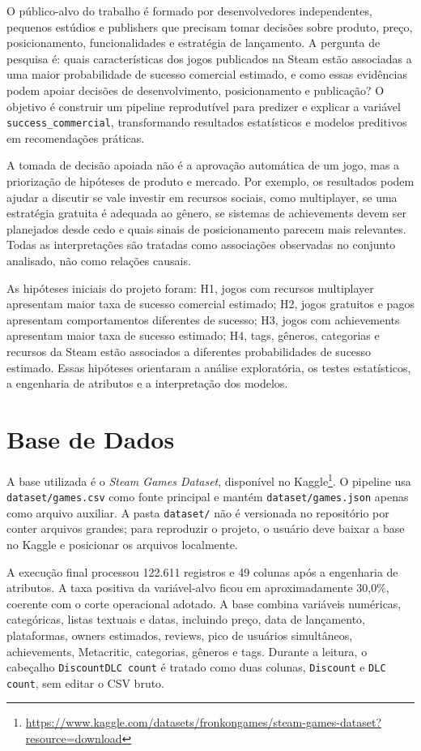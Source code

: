 \documentclass[12pt]{article}
\begin{document}
O público-alvo do trabalho é formado por desenvolvedores independentes, pequenos estúdios e publishers que precisam tomar decisões sobre produto, preço, posicionamento, funcionalidades e estratégia de lançamento. A pergunta de pesquisa é: quais características dos jogos publicados na Steam estão associadas a uma maior probabilidade de sucesso comercial estimado, e como essas evidências podem apoiar decisões de desenvolvimento, posicionamento e publicação? O objetivo é construir um pipeline reprodutível para predizer e explicar a variável \texttt{success\_commercial}, transformando resultados estatísticos e modelos preditivos em recomendações práticas.

A tomada de decisão apoiada não é a aprovação automática de um jogo, mas a priorização de hipóteses de produto e mercado. Por exemplo, os resultados podem ajudar a discutir se vale investir em recursos sociais, como multiplayer, se uma estratégia gratuita é adequada ao gênero, se sistemas de achievements devem ser planejados desde cedo e quais sinais de posicionamento parecem mais relevantes. Todas as interpretações são tratadas como associações observadas no conjunto analisado, não como relações causais.

As hipóteses iniciais do projeto foram: H1, jogos com recursos multiplayer apresentam maior taxa de sucesso comercial estimado; H2, jogos gratuitos e pagos apresentam comportamentos diferentes de sucesso; H3, jogos com achievements apresentam maior taxa de sucesso estimado; H4, tags, gêneros, categorias e recursos da Steam estão associados a diferentes probabilidades de sucesso estimado. Essas hipóteses orientaram a análise exploratória, os testes estatísticos, a engenharia de atributos e a interpretação dos modelos.

\section{Base de Dados}

A base utilizada é o \textit{Steam Games Dataset}, disponível no Kaggle\footnote{\url{https://www.kaggle.com/datasets/fronkongames/steam-games-dataset?resource=download}}. O pipeline usa \texttt{dataset/games.csv} como fonte principal e mantém \texttt{dataset/games.json} apenas como arquivo auxiliar. A pasta \texttt{dataset/} não é versionada no repositório por conter arquivos grandes; para reproduzir o projeto, o usuário deve baixar a base no Kaggle e posicionar os arquivos localmente.

A execução final processou 122.611 registros e 49 colunas após a engenharia de atributos. A taxa positiva da variável-alvo ficou em aproximadamente 30,0\%, coerente com o corte operacional adotado. A base combina variáveis numéricas, categóricas, listas textuais e datas, incluindo preço, data de lançamento, plataformas, owners estimados, reviews, pico de usuários simultâneos, achievements, Metacritic, categorias, gêneros e tags. Durante a leitura, o cabeçalho \texttt{DiscountDLC count} é tratado como duas colunas, \texttt{Discount} e \texttt{DLC count}, sem editar o CSV bruto.
\end{document}

